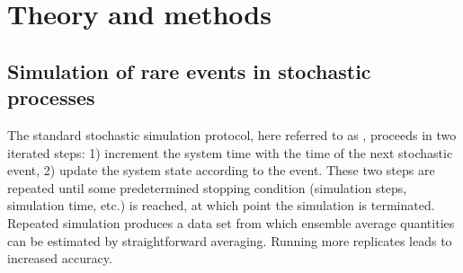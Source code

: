 %
%
%
%

\section{Theory and methods}
\label{sec:methods}

\subsection{Simulation of rare events in stochastic processes}
\label{sec:ds_es_description}

The standard stochastic simulation protocol, here referred to as , proceeds in two iterated steps: 1) increment the system time with the time of the next stochastic event, 2) update the system state according to the event. These two steps are repeated until some predetermined stopping condition (simulation steps, simulation time, etc.) is reached, at which point the simulation is terminated. Repeated  simulation produces a data set from which ensemble average quantities can be estimated by straightforward averaging. Running more  replicates leads to increased accuracy.
	
